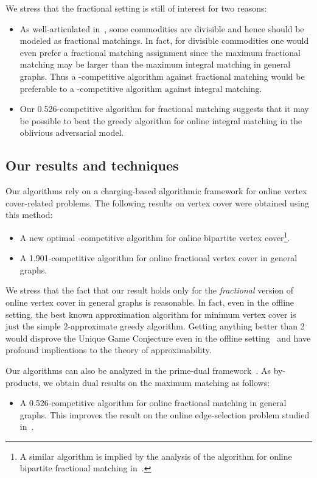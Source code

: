 \documentclass{article}
\begin{document}
We stress that the fractional setting is still of interest for two reasons:

\begin{itemize}
\item As well-articulated in~\cite{Buchbinder2007}, some commodities are divisible and hence should be modeled as fractional matchings. In fact, for divisible commodities one would even prefer a fractional matching assignment since the maximum fractional matching may be larger than the maximum integral matching in general graphs. Thus a -competitive algorithm against fractional matching would be preferable to a -competitive algorithm against integral matching.
\item Our 0.526-competitive algorithm for fractional matching suggests that it may be possible to beat the greedy algorithm for online integral matching in the oblivious adversarial model.
\end{itemize}

\subsection{Our results and techniques}

Our algorithms rely on a charging-based algorithmic framework for online vertex cover-related problems. The following results on vertex cover were obtained using this method:
\begin{itemize}
\item A new optimal -competitive algorithm for online bipartite vertex cover\footnote{A similar algorithm is implied by the analysis of the algorithm for online bipartite fractional matching in~\cite{Buchbinder2007}.}.
\item A 1.901-competitive algorithm for online fractional vertex cover in general graphs.
\end{itemize}

We stress that the fact that our result holds only for the \emph{fractional} version of online vertex cover in general graphs is reasonable. In fact, even in the offline setting, the best known approximation algorithm for minimum vertex cover is just the simple 2-approximate greedy algorithm. Getting anything better than 2 would disprove the Unique Game Conjecture even in the offline setting~\cite{Khot2008} and have profound implications to the theory of approximability.

Our algorithms can also be analyzed in the prime-dual framework~\cite{Buchbinder2007}. As by-products, we obtain dual results on the maximum matching as follows:
\begin{itemize}
\item A 0.526-competitive algorithm for online fractional matching in general graphs. This improves the result on the online edge-selection problem studied in~\cite{Blum2006}.
\end{itemize}
\end{document}
